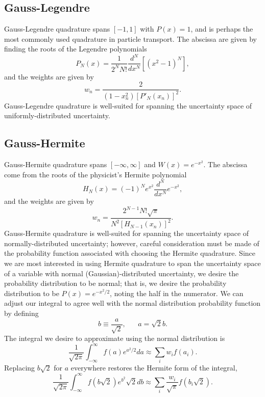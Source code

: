 \documentclass[11pt]{article} %
\begin{document}
\subsection{Gauss-Legendre}
Gauss-Legendre quadrature spans $[-1,1]$ with $P(x)=1$, and is perhaps the most commonly used quadrature in particle transport.  The abscissa are given by finding the roots of the Legendre polynomials
\begin{equation}
P_N(x)=\frac{1}{2^NN!}\frac{d^N}{dx^N}[(x^2-1)^N],
\end{equation}
and the weights are given by
\begin{equation}
w_n=\frac{2}{(1-x_n^2)[P'_N(x_n)]^2}.
\end{equation}
Gauss-Legendre quadrature is well-suited for spanning the uncertainty space of uniformly-distributed uncertainty.


\subsection{Gauss-Hermite}
Gauss-Hermite quadrature spans $[-\infty,\infty]$ and $W(x)=e^{-x^2}$.  The abscissa come from the roots of the physicist's Hermite polynomial
\begin{equation}
H_N(x)=(-1)^Ne^{x^2}\frac{d^N}{dx^N}e^{-x^2},
\end{equation}
and the weights are given by
\begin{equation}
w_n=\frac{2^{N-1}N!\sqrt\pi}{N^2[H_{N-1}(x_n)]^2}.
\end{equation}
Gauss-Hermite quadrature is well-suited for spanning the uncertainty space of normally-distributed uncertainty; however, careful consideration must be made of the probability function associated with choosing the Hermite quadrature.  Since we are most interested in using Hermite quadrature to span the uncertainty space of a variable with normal (Gaussian)-distributed uncertainty, we desire the probability distribution to be normal; that is, we desire the probability distribution to be $P(x)=e^{-x^2/2}$, noting the half in the numerator.  We can adjust our integral to agree well with the normal distribution probability function by defining
\begin{equation}
b\equiv\frac{a}{\sqrt{2}},\hspace{20pt}a=\sqrt{2}b.
\end{equation}
The integral we desire to approximate using the normal distribution is
\begin{equation}
\frac{1}{\sqrt{2\pi}}\int_{-\infty}^{\infty} f(a)e^{a^2/2}da\approx\sum_iw_if(a_i).
\end{equation}
Replacing $b\sqrt{2}$ for $a$ everywhere restores the Hermite form of the integral,
\begin{equation}
\frac{1}{\sqrt{2\pi}}\int_{-\infty}^{\infty} f(b\sqrt{2})e^{b^2}\sqrt{2}db\approx\sum_i\frac{w_i}{\sqrt\pi}f(b_i\sqrt{2}).
\end{equation}
\end{document}
